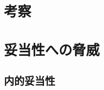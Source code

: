\documentclass[paper]{ieicej}
\begin{document}

\section{考察}\label{chap:consideration}


\section{妥当性への脅威}\label{chap:heuristic}
\subsection{内的妥当性}


\end{document}
